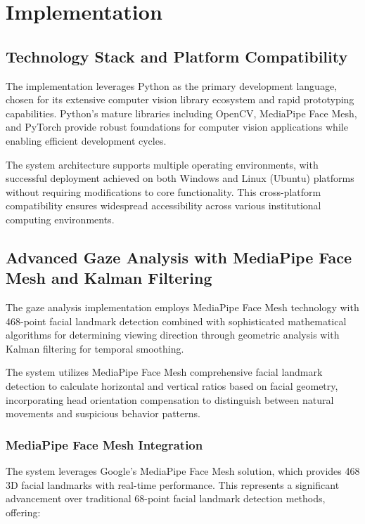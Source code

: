 \documentclass[conference]{IEEEtran}
\begin{document}
\section{Implementation}

\subsection{Technology Stack and Platform Compatibility}

The implementation leverages Python as the primary development language, chosen for its 
extensive computer vision library ecosystem and rapid prototyping capabilities. Python's 
mature libraries including OpenCV, MediaPipe Face Mesh, and PyTorch provide robust 
foundations for computer vision applications while enabling efficient development cycles.

The system architecture supports multiple operating environments, with successful 
deployment achieved on both Windows and Linux (Ubuntu) platforms without requiring 
modifications to core functionality. This cross-platform compatibility ensures 
widespread accessibility across various institutional computing environments.

\subsection{Advanced Gaze Analysis with MediaPipe Face Mesh and Kalman Filtering}

The gaze analysis implementation employs MediaPipe Face Mesh technology with 468-point 
facial landmark detection combined with sophisticated mathematical algorithms for 
determining viewing direction through geometric analysis with Kalman filtering for 
temporal smoothing\cite{aung2022real,jeong2014kalman,li2020hksiamfc}. 

The system utilizes MediaPipe Face Mesh comprehensive facial landmark detection to 
calculate horizontal and vertical ratios based on facial geometry, incorporating head 
orientation compensation to distinguish between natural movements and suspicious 
behavior patterns\cite{jakhete2024comprehensive}.

\subsubsection{MediaPipe Face Mesh Integration}

The system leverages Google's MediaPipe Face Mesh solution, which provides 468 3D 
facial landmarks with real-time performance. This represents a significant advancement 
over traditional 68-point facial landmark detection methods, offering:
\end{document}

